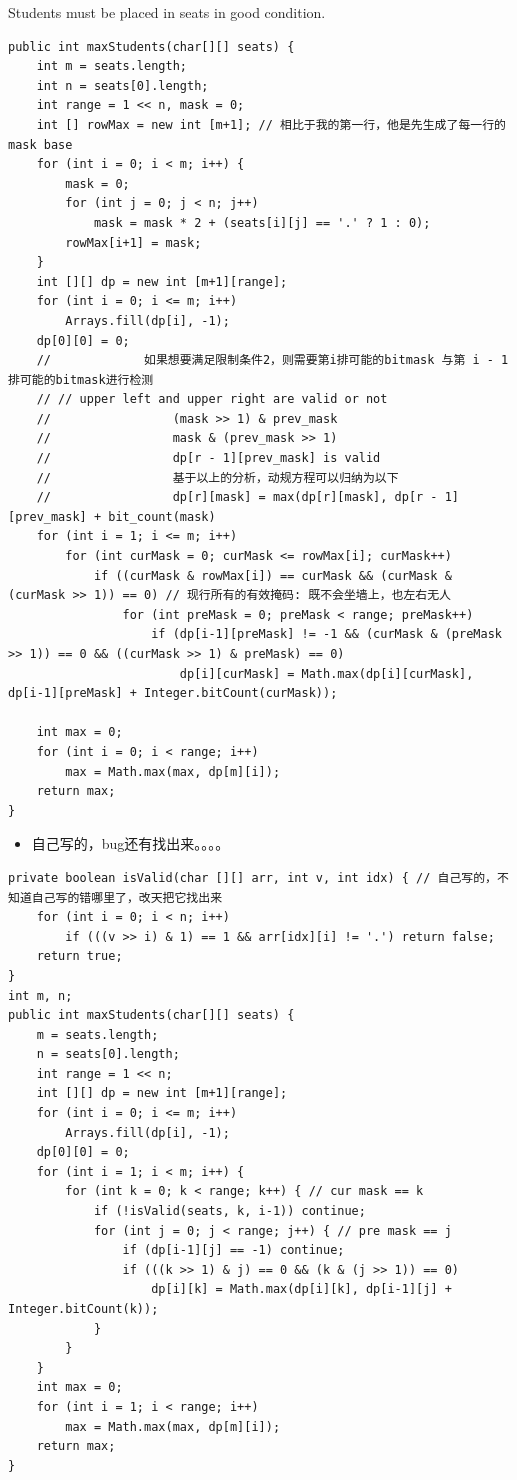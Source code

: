 \documentclass[9pt, b5paper]{article}
\begin{document}
Students must be placed in seats in good condition.
\begin{verbatim}
public int maxStudents(char[][] seats) {
    int m = seats.length;
    int n = seats[0].length;
    int range = 1 << n, mask = 0;
    int [] rowMax = new int [m+1]; // 相比于我的第一行，他是先生成了每一行的mask base
    for (int i = 0; i < m; i++) { 
        mask = 0;
        for (int j = 0; j < n; j++) 
            mask = mask * 2 + (seats[i][j] == '.' ? 1 : 0);
        rowMax[i+1] = mask;
    }
    int [][] dp = new int [m+1][range];
    for (int i = 0; i <= m; i++) 
        Arrays.fill(dp[i], -1);
    dp[0][0] = 0;
    //             如果想要满足限制条件2，则需要第i排可能的bitmask 与第 i - 1排可能的bitmask进行检测
    // // upper left and upper right are valid or not
    //                 (mask >> 1) & prev_mask 
    //                 mask & (prev_mask >> 1)
    //                 dp[r - 1][prev_mask] is valid
    //                 基于以上的分析，动规方程可以归纳为以下
    //                 dp[r][mask] = max(dp[r][mask], dp[r - 1][prev_mask] + bit_count(mask)
    for (int i = 1; i <= m; i++) 
        for (int curMask = 0; curMask <= rowMax[i]; curMask++) 
            if ((curMask & rowMax[i]) == curMask && (curMask & (curMask >> 1)) == 0) // 现行所有的有效掩码: 既不会坐墙上，也左右无人
                for (int preMask = 0; preMask < range; preMask++) 
                    if (dp[i-1][preMask] != -1 && (curMask & (preMask >> 1)) == 0 && ((curMask >> 1) & preMask) == 0)
                        dp[i][curMask] = Math.max(dp[i][curMask], dp[i-1][preMask] + Integer.bitCount(curMask));

    int max = 0;
    for (int i = 0; i < range; i++) 
        max = Math.max(max, dp[m][i]);
    return max;
}
\end{verbatim}
\begin{itemize}
\item 自己写的，bug还有找出来。。。。
\end{itemize}
\begin{verbatim}
private boolean isValid(char [][] arr, int v, int idx) { // 自己写的，不知道自己写的错哪里了，改天把它找出来
    for (int i = 0; i < n; i++) 
        if (((v >> i) & 1) == 1 && arr[idx][i] != '.') return false;
    return true;
}
int m, n;
public int maxStudents(char[][] seats) {
    m = seats.length;
    n = seats[0].length;
    int range = 1 << n;
    int [][] dp = new int [m+1][range];
    for (int i = 0; i <= m; i++) 
        Arrays.fill(dp[i], -1);
    dp[0][0] = 0;
    for (int i = 1; i < m; i++) {
        for (int k = 0; k < range; k++) { // cur mask == k
            if (!isValid(seats, k, i-1)) continue;
            for (int j = 0; j < range; j++) { // pre mask == j
                if (dp[i-1][j] == -1) continue;
                if (((k >> 1) & j) == 0 && (k & (j >> 1)) == 0)
                    dp[i][k] = Math.max(dp[i][k], dp[i-1][j] + Integer.bitCount(k));
            }
        }
    }
    int max = 0;
    for (int i = 1; i < range; i++) 
        max = Math.max(max, dp[m][i]);
    return max;
}
\end{verbatim}
\end{document}
